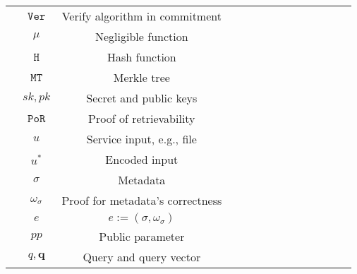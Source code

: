 \begin{table*}[!htbp]
\begin{scriptsize}
\begin{center}
{{\begin{tabular}{|c|c|c|c|c|c|c|c|c|c|c|c|c|c|}
&\cellcolor{white!20}\scriptsize$\mathtt{Ver}$ &\cellcolor{white!20}\scriptsize  Verify algorithm in commitment\\   
               

&\cellcolor{gray!20}\scriptsize$\mu$ &\cellcolor{gray!20}\scriptsize Negligible function\\  
                      
&\cellcolor{white!20}\scriptsize$\mathtt{H}$ &\cellcolor{white!20}\scriptsize Hash function\\

&\cellcolor{gray!20}\scriptsize$\mathtt{MT}$ &\cellcolor{gray!20}\scriptsize Merkle tree\\                    

&\cellcolor{white!20}\scriptsize${sk,pk}$ &\cellcolor{white!20}\scriptsize Secret and public keys\\     
   
&\cellcolor{gray!20}\scriptsize$\mathtt{PoR}$ &\cellcolor{gray!20}\scriptsize Proof of retrievability\\
     
&\cellcolor{white!20}\scriptsize$u$ &\cellcolor{white!20}\scriptsize Service input, e.g., file\\   
        
&\cellcolor{gray!20}\scriptsize$u^{\scriptscriptstyle*}$ &\cellcolor{gray!20}\scriptsize Encoded  input\\   
     
&\cellcolor{white!20}\scriptsize$\sigma$ &\cellcolor{white!20}\scriptsize Metadata\\ 
           
&\cellcolor{gray!20}\scriptsize$\omega_{\scriptscriptstyle\sigma}$ &\cellcolor{gray!20}\scriptsize Proof for metadata's correctness\\ 
             
&\cellcolor{white!20}\scriptsize$e$ &\cellcolor{white!20}\scriptsize $e:=(\sigma,\omega_{\scriptscriptstyle\sigma})$\\
             
           
&\cellcolor{gray!20}\scriptsize$pp$ &\cellcolor{gray!20}\scriptsize Public parameter\\ 
           
             
&\cellcolor{white!20}\scriptsize$q,\bm{q}$ &\cellcolor{white!20}\scriptsize Query and query vector\\  
              

\end{tabular}}}
\end{center}
\end{scriptsize}
\end{table*}

